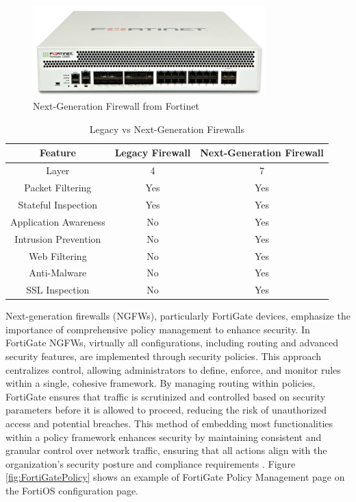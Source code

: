 \documentclass[12pt]{report}
\begin{document}
\begin{figure}[h]
    \centering
    \includegraphics[width=0.8\textwidth]{images/FortiGate.png}
    \caption{Next-Generation Firewall from Fortinet \cite{FNFWIMG}}
    \label{fig:NGFW}
\end{figure}

\begin{table}[h]
    \centering
    \begin{tabular}{|c|c|c|}
    \hline
    \textbf{Feature} & \textbf{Legacy Firewall} & \textbf{Next-Generation Firewall} \\ \hline
    Layer & 4 & 7 \\ \hline
    Packet Filtering & Yes & Yes \\ \hline
    Stateful Inspection & Yes & Yes \\ \hline
    Application Awareness & No & Yes \\ \hline
    Intrusion Prevention & No & Yes \\ \hline
    Web Filtering & No & Yes \\ \hline
    Anti-Malware & No & Yes \\ \hline
    SSL Inspection & No & Yes \\ \hline
    \end{tabular}
    \caption{Legacy vs Next-Generation Firewalls}
    \label{tab:firewalls}
\end{table}
Next-generation firewalls (NGFWs), particularly FortiGate devices, emphasize the importance of comprehensive policy management to enhance security. In FortiGate NGFWs, virtually all configurations, including routing and advanced security features, are implemented through security policies. This approach centralizes control, allowing administrators to define, enforce, and monitor rules within a single, cohesive framework. By managing routing within policies, FortiGate ensures that traffic is scrutinized and controlled based on security parameters before it is allowed to proceed, reducing the risk of unauthorized access and potential breaches. This method of embedding most functionalities within a policy framework enhances security by maintaining consistent and granular control over network traffic, ensuring that all actions align with the organization's security posture and compliance requirements \cite{Policies}. Figure \ref{fig:FortiGatePolicy} shows an example of FortiGate Policy Management page on the FortiOS configuration page.
\end{document}
